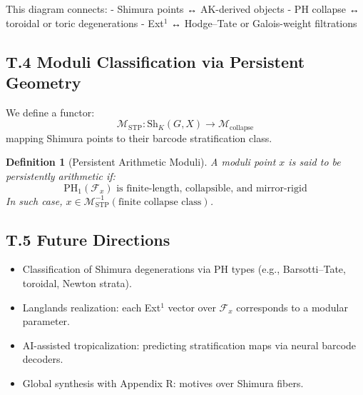 \documentclass[11pt]{article}
\newtheorem{definition}[theorem]{Definition}
\begin{document}
\vspace{1em}
\begin{center}
\end{center}
\vspace{1em}

This diagram connects:
- Shimura points ↔ AK-derived objects  
- PH collapse ↔ toroidal or toric degenerations  
- Ext$^1$ ↔ Hodge–Tate or Galois-weight filtrations

\subsection*{T.4 Moduli Classification via Persistent Geometry}

We define a functor:
\[
\mathscr{M}_{\mathrm{STP}}: \mathrm{Sh}_K(G,X) \to \mathcal{M}_{\mathrm{collapse}}
\]
mapping Shimura points to their barcode stratification class.

\begin{definition}[Persistent Arithmetic Moduli]
A moduli point \( x \) is said to be persistently arithmetic if:
\[
\mathrm{PH}_1(\mathcal{F}_x) \text{ is finite-length, collapsible, and mirror-rigid}
\]
In such case, \( x \in \mathscr{M}_{\mathrm{STP}}^{-1}(\text{finite collapse class}) \).
\end{definition}

\subsection*{T.5 Future Directions}

\begin{itemize}
  \item Classification of Shimura degenerations via PH types (e.g., Barsotti–Tate, toroidal, Newton strata).
  \item Langlands realization: each Ext$^1$ vector over \( \mathcal{F}_x \) corresponds to a modular parameter.
  \item AI-assisted tropicalization: predicting stratification maps via neural barcode decoders.
  \item Global synthesis with Appendix R: motives over Shimura fibers.
\end{itemize}
\end{document}
